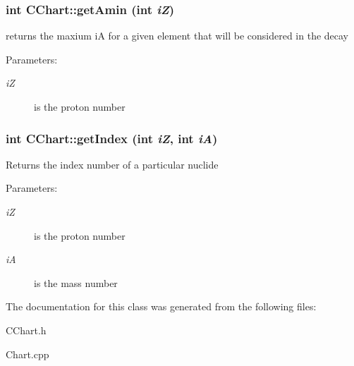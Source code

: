 \subsubsection{\setlength{\rightskip}{0pt plus 5cm}int CChart::get\-Amin (int {\em i\-Z})}\label{classCChart_e055972f3bdbd9445d9c8880cb3f8038}


returns the maxium i\-A for a given element that will be considered in the decay \begin{Desc}
\item[Parameters:]
\begin{description}
\item[{\em i\-Z}]is the proton number \end{description}
\end{Desc}
\subsubsection{\setlength{\rightskip}{0pt plus 5cm}int CChart::get\-Index (int {\em i\-Z}, int {\em i\-A})}\label{classCChart_3eec994101c137549298aa062d8a45ce}


Returns the index number of a particular nuclide \begin{Desc}
\item[Parameters:]
\begin{description}
\item[{\em i\-Z}]is the proton number \item[{\em i\-A}]is the mass number \end{description}
\end{Desc}


The documentation for this class was generated from the following files:\begin{CompactItemize}
\item 
CChart.h\item 
Chart.cpp\end{CompactItemize}
